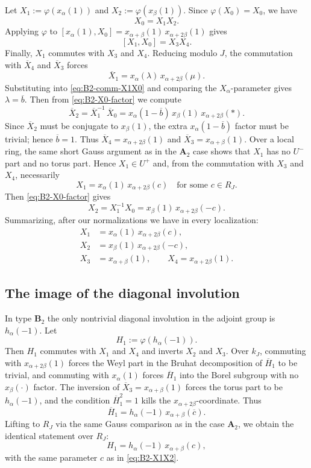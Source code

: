 \documentclass[]{jgcc}
\numberwithin{equation}{section}
\begin{document}
Let $X_1:=\varphi(x_\alpha(1))$ and $X_2:=\varphi(x_\beta(1))$.
Since $\varphi(X_0)=X_0$, we have
\begin{equation}\label{eq:B2-X0-factor}
X_0=X_1X_2.
\end{equation}
Applying $\varphi$ to $[x_\alpha(1),X_0]=x_{\alpha+\beta}(1)\,x_{\alpha+2\beta}(1)$ gives
\begin{equation}\label{eq:B2-comm-X1X0}
[X_1,X_0]=X_3X_4.
\end{equation}
Finally, $X_1$ commutes with $X_3$ and $X_4$.
Reducing modulo $J$, the commutation with $\overline X_4$ and $\overline X_3$ forces
\[
\overline X_1=x_\alpha(\lambda)\,x_{\alpha+2\beta}(\mu).
\]
Substituting into \eqref{eq:B2-comm-X1X0} and comparing the $X_\alpha$-parameter gives $\lambda=\overline b$.
Then from \eqref{eq:B2-X0-factor} we compute
\[
\overline X_2=\overline X_1^{-1}\,\overline X_0
=x_\alpha(1-\overline b)\,x_\beta(1)\,x_{\alpha+2\beta}(\ast).
\]
Since $\overline X_2$ must be conjugate to $x_\beta(1)$, the extra $x_\alpha(1-\overline b)$ factor must be trivial; hence $\overline b=1$.
Thus $\overline X_4=x_{\alpha+2\beta}(1)$ and $\overline X_3=x_{\alpha+\beta}(1)$.
Over a local ring, the same short Gauss argument as in the $\mathbf A_2$ case shows that $X_1$ has no $U^-$ part and no torus part.
Hence $X_1\in U^+$ and, from the commutation with $X_3$ and $X_4$, necessarily
\[
X_1=x_\alpha(1)\,x_{\alpha+2\beta}(c)
\quad\text{for some }c\in R_J.
\]
Then \eqref{eq:B2-X0-factor} gives
\[
X_2=X_1^{-1}X_0=x_\beta(1)\,x_{\alpha+2\beta}(-c).
\]
Summarizing, after our normalizations we have in every localization:
\begin{align}
X_1&=x_\alpha(1)\,x_{\alpha+2\beta}(c),\label{eq:B2-X1X2}\\
X_2&=x_\beta(1)\,x_{\alpha+2\beta}(-c),\nonumber\\
X_3&=x_{\alpha+\beta}(1),\qquad
X_4=x_{\alpha+2\beta}(1).\nonumber
\end{align}

\subsection{The image of the diagonal involution}

In type $\mathbf B_2$ the only nontrivial diagonal involution in the adjoint group is $h_\alpha(-1)$.
Let
\[
H_1:=\varphi(h_\alpha(-1)).
\]
Then $H_1$ commutes with $X_1$ and $X_4$ and inverts $X_2$ and $X_3$.
Over $k_J$, commuting with $x_{\alpha+2\beta}(1)$ forces the Weyl part in the Bruhat decomposition of $\overline H_1$
to be trivial, and commuting with $x_\alpha(1)$ forces $\overline H_1$ into the Borel subgroup with no $x_\beta(\cdot)$ factor.
The inversion of $\overline X_3=x_{\alpha+\beta}(1)$ forces the torus part to be $h_\alpha(-1)$, and the condition $\overline H_1^2=1$ kills the $x_{\alpha+2\beta}$-coordinate.
Thus
\[
\overline H_1=h_\alpha(-1)\,x_{\alpha+\beta}(\overline c).
\]
Lifting to $R_J$ via the same Gauss comparison as in the case $\mathbf A_2$, we obtain the identical statement over $R_J$:
\begin{equation}\label{eq:B2-H1}
H_1=h_\alpha(-1)\,x_{\alpha+\beta}(c),
\end{equation}
with the same parameter $c$ as in \eqref{eq:B2-X1X2}.
\end{document}
